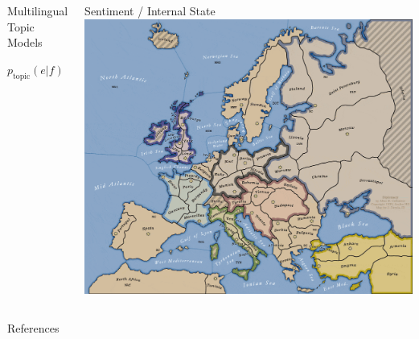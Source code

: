 \documentclass[xcolor=dvipsnames,xcolor=table]{beamer}
\begin{document}
{\begin{columns}
    \begin{block}{Multilingual Topic Models}
      \begin{center}
        \begin{large}
          $p_{\mbox{topic}}(e | f)$ \\
         \end{large}
      \cite{eidelman-12,hu-14}
       \end{center}
    \vspace{-.3cm}
    \end{block}


    \begin{block}{Sentiment / Internal State}
    \centering
        \includegraphics[width=0.4\linewidth]{general_figures/diplomacy} \\
        \cite{niculae-15,sayeed-12,boyd-graber-10}
    \end{block}




\end{columns}

}

\begin{frame}{References}

\tiny

\end{frame}
\end{document}
